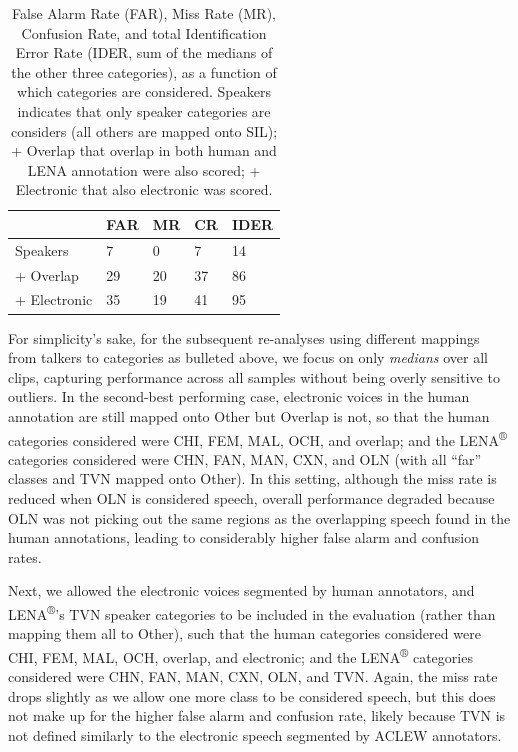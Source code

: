 \documentclass[english,table,man,floatsintext]{apa6}
\begin{document}
\begin{table}[tbp]

\begin{center}
\begin{threeparttable}

\caption{\label{tab:tabalts}False Alarm Rate (FAR), Miss Rate (MR), Confusion Rate, and total Identification Error Rate (IDER, sum of the medians of the other three categories), as a function of which categories are considered. Speakers indicates that only speaker categories are considers (all others are mapped onto SIL); + Overlap that overlap in both human and LENA annotation were also scored; + Electronic that also electronic was scored.}

\begin{tabular}{lllll}
\toprule
 & \multicolumn{1}{c}{FAR} & \multicolumn{1}{c}{MR} & \multicolumn{1}{c}{CR} & \multicolumn{1}{c}{IDER}\\
\midrule
Speakers & 7 & 0 & 7 & 14\\
+ Overlap & 29 & 20 & 37 & 86\\
+ Electronic & 35 & 19 & 41 & 95\\
\bottomrule
\end{tabular}

\end{threeparttable}
\end{center}

\end{table}

For simplicity's sake, for the subsequent re-analyses using different mappings from talkers to categories as bulleted above, we focus on only \emph{medians} over all clips, capturing performance across all samples without being overly sensitive to outliers. In the second-best performing case, electronic voices in the human annotation are still mapped onto Other but Overlap is not, so that the human categories considered were CHI, FEM, MAL, OCH, and overlap; and the LENA\textsuperscript{®} categories considered were CHN, FAN, MAN, CXN, and OLN (with all \enquote{far} classes and TVN mapped onto Other). In this setting, although the miss rate is reduced when OLN is considered speech, overall performance degraded because OLN was not picking out the same regions as the overlapping speech found in the human annotations, leading to considerably higher false alarm and confusion rates.

Next, we allowed the electronic voices segmented by human annotators, and LENA\textsuperscript{®}'s TVN speaker categories to be included in the evaluation (rather than mapping them all to Other), such that the human categories considered were CHI, FEM, MAL, OCH, overlap, and electronic; and the LENA\textsuperscript{®} categories considered were CHN, FAN, MAN, CXN, OLN, and TVN. Again, the miss rate drops slightly as we allow one more class to be considered speech, but this does not make up for the higher false alarm and confusion rate, likely because TVN is not defined similarly to the electronic speech segmented by ACLEW annotators.
\end{document}
